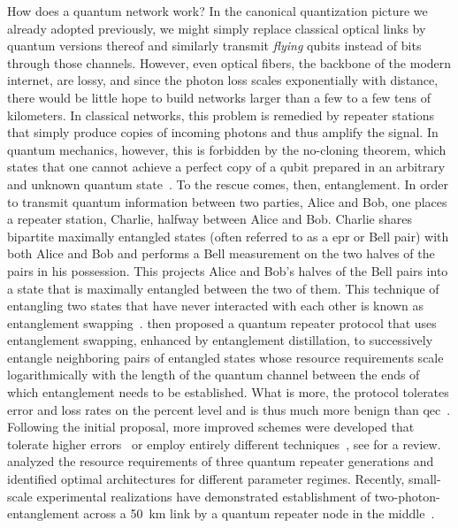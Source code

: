 How does a quantum network work?
In the canonical quantization picture we already adopted previously, we might simply replace classical optical links by quantum versions thereof and similarly transmit \emph{flying} qubits instead of bits through those channels.
However, even optical fibers, the backbone of the modern internet, are lossy, and since the photon loss scales exponentially with distance, there would be little hope to build networks larger than a few to a few tens of kilometers.
In classical networks, this problem is remedied by repeater stations that simply produce copies of incoming photons and thus amplify the signal.
In quantum mechanics, however, this is forbidden by the no-cloning theorem, which states that one cannot achieve a perfect copy of a qubit prepared in an arbitrary and unknown quantum state~\cite{Wootters1982,Dieks1982}.
To the rescue comes, then, entanglement.
In order to transmit quantum information between two parties, Alice and Bob, one places a repeater station, Charlie, halfway between Alice and Bob.
Charlie shares bipartite maximally entangled states (often referred to as a \gls{epr} or Bell pair) with both Alice and Bob and performs a Bell measurement on the two halves of the pairs in his possession.
This projects Alice and Bob's halves of the Bell pairs into a state that is maximally entangled between the two of them.
This technique of entangling two states that have never interacted with each other is known as entanglement swapping~\cite{Zukowski1993,Pan1998}.
\textcite{Briegel1998,Dur1999} then proposed a quantum repeater protocol that uses entanglement swapping, enhanced by entanglement distillation,
to successively entangle neighboring pairs of entangled states whose resource requirements scale logarithmically with the length of the quantum channel between the ends of which entanglement needs to be established.
What is more, the protocol tolerates error and loss rates on the percent level and is thus much more benign than \gls{qec}~\cite{Terhal2015}.
Following the initial proposal, more improved schemes were developed that tolerate higher errors~\cite{Dur2007} or employ entirely different techniques~\cite{Bayrakci2022}, see  for a review.
\textcite{Muralidharan2016} analyzed the resource requirements of three quantum repeater generations and identified optimal architectures for different parameter regimes.
Recently, small-scale experimental realizations have demonstrated establishment of two-photon-entanglement across a \qty{50}{\kilo\meter} link by a quantum repeater node in the middle~\cite{Krutyanskiy2023}.

